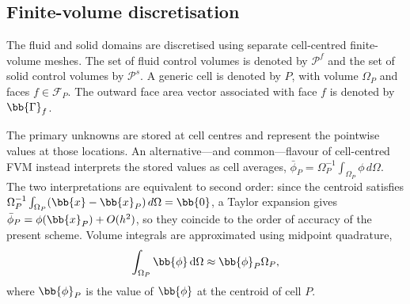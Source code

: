 \subsection{Finite-volume discretisation}
\label{qm:sec:fv_discretisation}

The fluid and solid domains are discretised using separate cell-centred finite-volume meshes.
The set of fluid control volumes is denoted by $\mathcal{P}^f$ and the set of solid control volumes by $\mathcal{P}^s$.
A generic cell is denoted by $P$, with volume $\Omega_P$ and faces $f \in \mathcal{F}_P$. The outward face area vector associated with face $f$ is
denoted by $\bb{\Gamma}_f$.

The primary unknowns are stored at cell centres and represent the pointwise values at those locations.
An alternative---and common---flavour of cell-centred FVM instead interprets the stored values as cell averages, $\bar{\phi}_P = \Omega_P^{-1}\int_{\Omega_P}\phi\,d\Omega$.
The two interpretations are equivalent to second order: since the centroid satisfies $\Omega_P^{-1}\int_{\Omega_P}(\bb{x}-\bb{x}_P)\,d\Omega = \bb{0}$, a Taylor expansion gives $\bar{\phi}_P = \phi(\bb{x}_P) + O(h^2)$, so they coincide to the order of accuracy of the present scheme.
Volume integrals are approximated using midpoint quadrature,
\begin{equation}
    \int_{\Omega_P}
    \bb{\phi}
    \, \text{d}\Omega
    \approx
    \bb{\phi}_P \Omega_P ,
    \label{qm:eqn:fv_volume_integral}
\end{equation}
where $\bb{\phi}_P$ is the value of $\bb{\phi}$ at the centroid of cell $P$.

